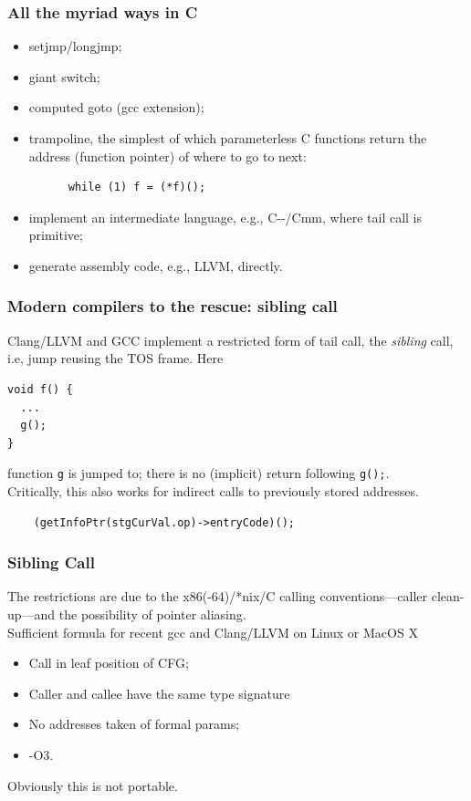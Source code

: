 \documentclass{beamer}
\begin{document}
\begin{frame}[fragile] %
\frametitle{All the myriad ways in C}
\begin{itemize}
\item setjmp/longjmp;
\item giant switch;
\item computed goto (gcc extension);
\item trampoline, the simplest of which parameterless C functions return the
  address (function pointer) of where to go to next:
\begin{verbatim}
      while (1) f = (*f)();
\end{verbatim}
\item implement an intermediate language, e.g., C-{}-/Cmm, where tail call is primitive;
\item generate assembly code, e.g., LLVM, directly.
\end{itemize}
\end{frame}


\begin{frame}[fragile]
\frametitle{Modern compilers to the rescue:  sibling call}
Clang/LLVM and GCC implement a restricted form of tail call, the \emph{sibling}
call, i.e, jump reusing the TOS frame.  Here
\begin{verbatim}
void f() {
  ...
  g();
}
\end{verbatim}
function \texttt{g} is jumped to; there is no (implicit) return following
\texttt{g();}.  
\\\vspace{0.1in}
Critically, this also works for indirect calls to previously stored addresses.
\begin{verbatim}
    (getInfoPtr(stgCurVal.op)->entryCode)();
\end{verbatim}

\end{frame}

\begin{frame}
\frametitle{Sibling Call}
The restrictions are due to the x86(-64)/*nix/C calling
conventions---caller clean-up---and the possibility of pointer aliasing.
\\\vspace{0.1in}
Sufficient formula for recent gcc and Clang/LLVM on Linux or MacOS X
\begin{itemize}
\item Call in leaf position of CFG;
\item Caller and callee have the same type signature
\item No addresses taken of formal params;
\item -O3.
\end{itemize}
Obviously this is not portable.
\end{frame}
\end{document}

